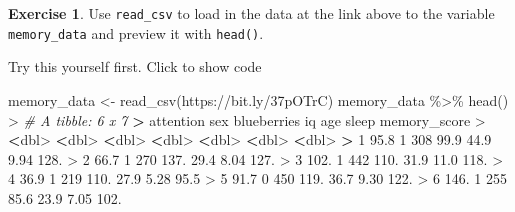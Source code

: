 \documentclass[
]{book}
\newenvironment{Shaded}{\begin{snugshade}}{\end{snugshade}}
\newcommand{\CommentTok}[1]{\textcolor[rgb]{0.56,0.35,0.01}{\textit{#1}}}
\newcommand{\DecValTok}[1]{\textcolor[rgb]{0.00,0.00,0.81}{#1}}
\newcommand{\ErrorTok}[1]{\textcolor[rgb]{0.64,0.00,0.00}{\textbf{#1}}}
\newcommand{\FloatTok}[1]{\textcolor[rgb]{0.00,0.00,0.81}{#1}}
\newcommand{\FunctionTok}[1]{\textcolor[rgb]{0.00,0.00,0.00}{#1}}
\newcommand{\NormalTok}[1]{#1}
\newcommand{\OtherTok}[1]{\textcolor[rgb]{0.56,0.35,0.01}{#1}}
\newcommand{\SpecialCharTok}[1]{\textcolor[rgb]{0.00,0.00,0.00}{#1}}
\newcommand{\StringTok}[1]{\textcolor[rgb]{0.31,0.60,0.02}{#1}}
\theoremstyle{definition}
\theoremstyle{definition}
\theoremstyle{definition}
\newtheorem{exercise}{Exercise}[chapter]
\theoremstyle{definition}
\theoremstyle{remark}
\begin{document}
\begin{exercise}

Use \texttt{read\_csv} to load in the data at the link above to the variable \texttt{memory\_data} and preview it with \texttt{head()}.

Try this yourself first. Click to show code

\begin{Shaded}
\begin{Highlighting}[]
\NormalTok{memory\_data }\OtherTok{\textless{}{-}} \FunctionTok{read\_csv}\NormalTok{(}\StringTok{\textquotesingle{}https://bit.ly/37pOTrC\textquotesingle{}}\NormalTok{)}
\NormalTok{memory\_data }\SpecialCharTok{\%\textgreater{}\%} \FunctionTok{head}\NormalTok{()}
\SpecialCharTok{\textgreater{}} \CommentTok{\# A tibble: 6 x 7}
\ErrorTok{\textgreater{}}\NormalTok{   attention   sex blueberries    iq   age sleep memory\_score}
\SpecialCharTok{\textgreater{}}       \ErrorTok{\textless{}}\NormalTok{dbl}\SpecialCharTok{\textgreater{}} \ErrorTok{\textless{}}\NormalTok{dbl}\SpecialCharTok{\textgreater{}}       \ErrorTok{\textless{}}\NormalTok{dbl}\SpecialCharTok{\textgreater{}} \ErrorTok{\textless{}}\NormalTok{dbl}\SpecialCharTok{\textgreater{}} \ErrorTok{\textless{}}\NormalTok{dbl}\SpecialCharTok{\textgreater{}} \ErrorTok{\textless{}}\NormalTok{dbl}\SpecialCharTok{\textgreater{}}        \ErrorTok{\textless{}}\NormalTok{dbl}\SpecialCharTok{\textgreater{}}
\ErrorTok{\textgreater{}} \DecValTok{1}      \FloatTok{95.8}     \DecValTok{1}         \DecValTok{308}  \FloatTok{99.9}  \FloatTok{44.9}  \FloatTok{9.94}        \FloatTok{128.} 
\SpecialCharTok{\textgreater{}} \DecValTok{2}      \FloatTok{66.7}     \DecValTok{1}         \DecValTok{270} \FloatTok{137.}   \FloatTok{29.4}  \FloatTok{8.04}        \FloatTok{127.} 
\SpecialCharTok{\textgreater{}} \DecValTok{3}     \FloatTok{102.}      \DecValTok{1}         \DecValTok{442} \FloatTok{110.}   \FloatTok{31.9} \FloatTok{11.0}         \FloatTok{118.} 
\SpecialCharTok{\textgreater{}} \DecValTok{4}      \FloatTok{36.9}     \DecValTok{1}         \DecValTok{219} \FloatTok{110.}   \FloatTok{27.9}  \FloatTok{5.28}         \FloatTok{95.5}
\SpecialCharTok{\textgreater{}} \DecValTok{5}      \FloatTok{91.7}     \DecValTok{0}         \DecValTok{450} \FloatTok{119.}   \FloatTok{36.7}  \FloatTok{9.30}        \FloatTok{122.} 
\SpecialCharTok{\textgreater{}} \DecValTok{6}     \FloatTok{146.}      \DecValTok{1}         \DecValTok{255}  \FloatTok{85.6}  \FloatTok{23.9}  \FloatTok{7.05}        \FloatTok{102.}
\end{Highlighting}
\end{Shaded}


\end{exercise}
\end{document}
